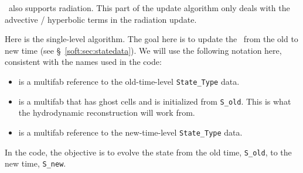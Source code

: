 \castro\ also supports radiation.  This part of the update algorithm
only deals with the advective / hyperbolic terms in the radiation update.

Here is the single-level algorithm.  The goal here is to update the
 \statedata\ from the old to new time (see
\S~\ref{soft:sec:statedata}).  We will use the following notation
here, consistent with the names used in the code:
\begin{itemize}
\item {} is a multifab reference to the old-time-level
  {\tt State\_Type} data.

\item {} is a multifab that has ghost cells and is
  initialized from {\tt S\_old}.  This is what the hydrodynamic
  reconstruction will work from.

\item {} is a multifab reference to the new-time-level
  {\tt State\_Type} data.
\end{itemize}

In the code, the objective is to evolve the state from the old time,
{\tt S\_old}, to the new time, {\tt S\_new}.

